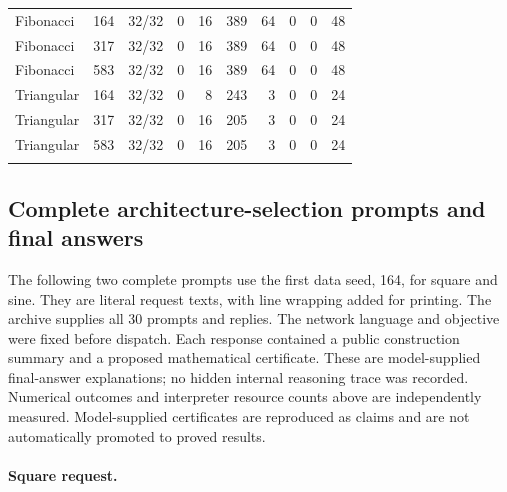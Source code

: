 \begin{table}[p]
\begin{tabular}{@{}lr r r r r r r r r@{}}
\addlinespace[2pt]

Fibonacci & 164 & 32/32 & 0 & 16 & 389 & 64 & 0 & 0 & 48\\

Fibonacci & 317 & 32/32 & 0 & 16 & 389 & 64 & 0 & 0 & 48\\

Fibonacci & 583 & 32/32 & 0 & 16 & 389 & 64 & 0 & 0 & 48\\

\addlinespace[2pt]

Triangular & 164 & 32/32 & 0 & 8 & 243 & 3 & 0 & 0 & 24\\

Triangular & 317 & 32/32 & 0 & 16 & 205 & 3 & 0 & 0 & 24\\

Triangular & 583 & 32/32 & 0 & 16 & 205 & 3 & 0 & 0 & 24\\

\addlinespace[2pt]

\bottomrule\end{tabular}\end{table}

\clearpage

\subsection{Complete architecture-selection prompts and final answers}\label{app:architecture_prompts}

The following two complete prompts use the first data seed, 164, for square and sine. They are literal request texts, with line wrapping added for printing. The archive supplies all 30 prompts and replies. The network language and objective were fixed before dispatch. Each response contained a public construction summary and a proposed mathematical certificate. These are model-supplied final-answer explanations; no hidden internal reasoning trace was recorded. Numerical outcomes and interpreter resource counts above are independently measured. Model-supplied certificates are reproduced as claims and are not automatically promoted to proved results.


\paragraph{Square request.}

